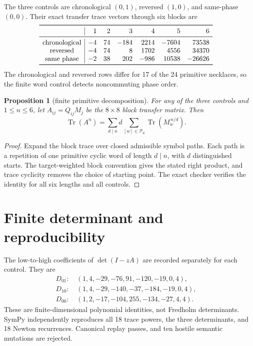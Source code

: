 \documentclass[10pt]{article}
\newtheorem{proposition}{Proposition}
\begin{document}
The three controls are chronological $(0,1)$, reversed $(1,0)$, and
same-phase $(0,0)$.  Their exact transfer trace vectors through six blocks are
\[
\begin{array}{c|rrrrrr}
\toprule
 &1&2&3&4&5&6\\
\midrule
\text{chronological} &-4&74&-184&2214&-7604&73538\\
\text{reversed}       &-4&74&8&1702&4556&34370\\
\text{same phase}     &-2&38&202&-986&10538&-26626\\
\bottomrule
\end{array}
\]
The chronological and reversed rows differ for 17 of the 24 primitive
necklaces, so the finite word control detects noncommuting phase order.

\begin{proposition}[finite primitive decomposition]
For any of the three controls and $1\le n\le6$, let $A_{ij}=Q_{ij}M_j$ be
the $8\times8$ block transfer matrix.  Then
\[
 \operatorname{Tr}(A^n)=\sum_{d\mid n}d
 \sum_{[w]\in\mathcal P_d}\operatorname{Tr}(M_w^{\,n/d}).
\]
\end{proposition}
\begin{proof}
Expand the block trace over closed admissible symbol paths.  Each path is a
repetition of one primitive cyclic word of length $d\mid n$, with $d$
distinguished starts.  The target-weighted block convention gives the stated
right product, and trace cyclicity removes the choice of starting point.
The exact checker verifies the identity for all six lengths and all controls.
\end{proof}

\section{Finite determinant and reproducibility}
The low-to-high coefficients of $\det(I-zA)$ are recorded separately for each
control.  They are
\[
\begin{aligned}
 D_{01}:&\ (1,4,-29,-76,91,-120,-19,0,4),\\
 D_{10}:&\ (1,4,-29,-140,-37,-184,-19,0,4),\\
 D_{00}:&\ (1,2,-17,-104,255,-134,-27,4,4).
\end{aligned}
\]
These are finite-dimensional polynomial identities, not Fredholm
determinants.  SymPy independently reproduces all 18 trace powers, the three
determinants, and 18 Newton recurrences.  Canonical replay passes, and ten
hostile semantic mutations are rejected.
\end{document}
